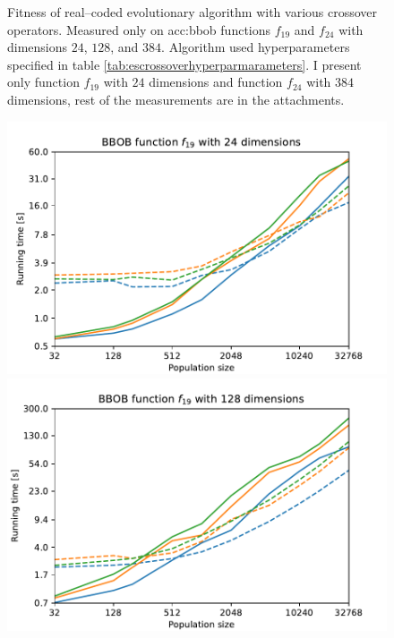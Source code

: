 \begin{figure}[ht!]
    \caption[Fitness of various crossover operators in real--coded evolutionary algorithms]{Fitness of real--coded evolutionary algorithm with various crossover operators. Measured only on \acrshort{acc:bbob} functions $f_{19}$ and $f_{24}$ with dimensions $24$, $128$, and $384$. Algorithm used hyperparameters specified in table \ref{tab:escrossoverhyperparmarameters}. I present only function $f_{19}$ with $24$ dimensions and function $f_{24}$ with $384$ dimensions, rest of the measurements are in the attachments.}
    \label{meas:crossfitness}
\end{figure}




\begin{figure}[ht!]
    \begin{minipage}[t]{0.32\textwidth}
        \centering
        \includegraphics[width=\textwidth]{img/runs/time_es_schema_fn19_24d.pdf}
    \end{minipage}
    \hfill
    \begin{minipage}[t]{0.32\textwidth}
        \centering
        \includegraphics[width=\textwidth]{img/runs/time_es_schema_fn19_128d.pdf}

\end{minipage}
\end{figure}
